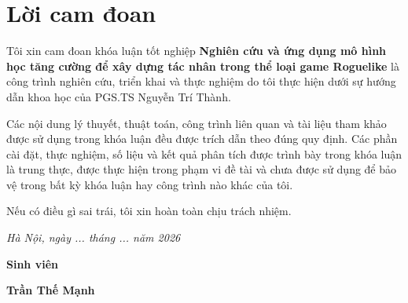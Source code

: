 \clearpage
\chapter*{Lời cam đoan}
{}

Tôi xin cam đoan khóa luận tốt nghiệp \textbf{Nghiên cứu và ứng dụng mô hình học tăng cường để xây dựng tác nhân trong thể loại game Roguelike} là công trình nghiên cứu, triển khai và thực nghiệm do tôi thực hiện dưới sự hướng dẫn khoa học của PGS.TS Nguyễn Trí Thành.

Các nội dung lý thuyết, thuật toán, công trình liên quan và tài liệu tham khảo được sử dụng trong khóa luận đều được trích dẫn theo đúng quy định. Các phần cài đặt, thực nghiệm, số liệu và kết quả phân tích được trình bày trong khóa luận là trung thực, được thực hiện trong phạm vi đề tài và chưa được sử dụng để bảo vệ trong bất kỳ khóa luận hay công trình nào khác của tôi.

Nếu có điều gì sai trái, tôi xin hoàn toàn chịu trách nhiệm.

\vspace{1cm}
\hspace{7cm}\textit{Hà Nội, ngày ... tháng ... năm 2026}

\hspace{9.4cm}\textbf{Sinh viên}
\vspace{2.5cm}


\hspace{8.85cm}\textbf{Trần Thế Mạnh}
